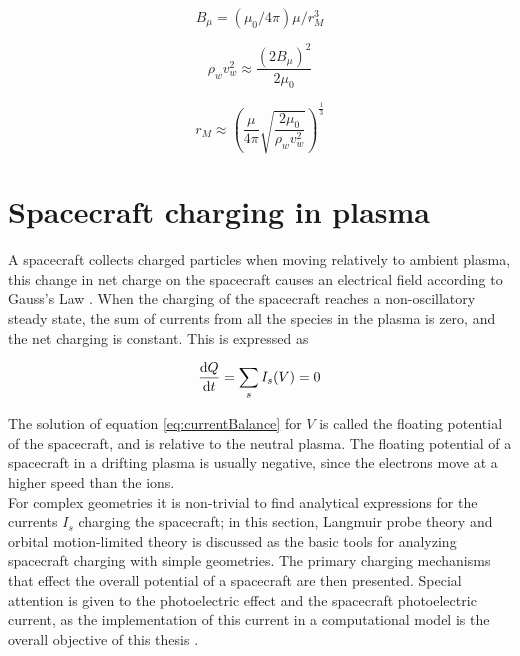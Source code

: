 \begin{equation}\label{eq:magFieldStrength}
    B_{\mu} = (\mu_0 / 4 \pi) \mu / r^3_M
\end{equation}



\begin{equation}\label{eq:pressureBalance}
    \rho_w v^2_w \approx \frac{(2 B_{\mu})^2}{2 \mu_0} 
\end{equation}


\begin{equation}
    r_M \approx \left(\frac{\mu}{4 \pi} \sqrt{\frac{2 \mu_0}{\rho_w v^2_w}} \right)^{\frac{1}{3}}
\end{equation}

\section{Spacecraft charging in plasma}
A spacecraft collects charged particles when moving relatively to ambient plasma, this change in net charge on the spacecraft causes an electrical field according to Gauss's Law . When the charging of the spacecraft reaches a non-oscillatory steady state, the sum of currents from all the species in the plasma is zero, and the net charging is constant. This is expressed as 

\begin{equation} \label{eq:currentBalance}
    \dv{Q}{t} = \sum_s I_s(V) = 0
\end{equation}

The solution of equation \ref{eq:currentBalance} for $V$ is called the floating potential of the spacecraft, and is relative to the neutral plasma. The floating potential of a spacecraft in a drifting plasma is usually negative, since the electrons move at a higher speed than the ions.
\\
For complex geometries it is non-trivial to find analytical expressions for the currents $I_s$ charging the spacecraft; in this section, Langmuir probe theory and orbital motion-limited theory is discussed as the basic tools for analyzing spacecraft charging with simple geometries. The primary charging mechanisms that effect the overall potential of a spacecraft are then presented. Special attention is given to the photoelectric effect and the spacecraft photoelectric current, as the implementation of this current in a computational model is the overall objective of this thesis .


